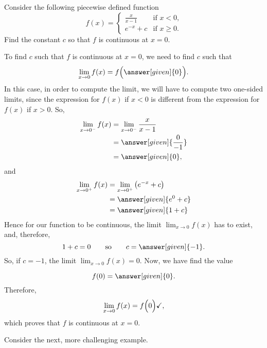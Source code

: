 \documentclass{ximera}
\begin{document}
\begin{example}
Consider the following piecewise defined function
\[
f(x) = 
\begin{cases}
  \frac{x}{x-1} &\text{if $x<0$,}\\
  e^{-x} + c &\text{if $x\ge 0$}.
\end{cases}
\]
Find the constant $c$ so that $f$ is continuous at $x=0$.
\begin{explanation}
  To find $c$ such that $f$ is continuous at $x=0$, we need to find
  $c$ such that
    \[
 \lim_{x\to 0} f(x) = f\Bigl(\answer[given]{0}\Bigr).
  \]
  In this case, in order to compute the limit, we will have to compute two one-sided limits, since the expression for  $f(x)$ if $x<0$ is  different from the expression for $f(x)$ if $x>0$.
  So,
  \begin{align*}
    \lim_{x\to 0^-} f(x) &= \lim_{x\to 0^-}\frac{x}{x-1}\\
    &= \answer[given]{\frac{0}{-1}}\\
    &=\answer[given]{0},
  \end{align*}
and
  \begin{align*}
    \lim_{x\to 0^+} f(x) &= \lim_{x\to 0^+}\left(e^{-x}+c\right)\\
    &= \answer[given]{e^0 + c}\\
    &= \answer[given]{1+ c}
  \end{align*}
  Hence for our function to be continuous, the limit $ \lim_{x\to 0} f(x)$ has to exist, and, therefore, 
  \[
  1 + c = 0\qquad\text{so}\qquad c = \answer[given]{-1}.
  \]
  So, if $c=-1$, the limit $ \lim_{x\to 0} f(x)=0$. Now, we have find the value

\[
  f(0) = \answer[given]{0}.
  \]
  Therefore,
   \[
 \lim_{x\to 0} f(x) = f\Bigl(0\Bigr)\checkmark,
  \]
  which proves that $f$ is continuous at $x=0$.
\end{explanation}
\end{example}


Consider the next, more challenging example.
\end{document}
